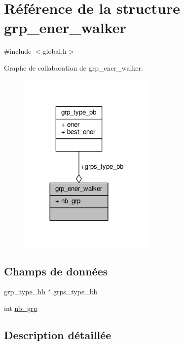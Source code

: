 \hypertarget{structgrp__ener__walker}{\section{Référence de la structure grp\+\_\+ener\+\_\+walker}
\label{structgrp__ener__walker}
}


{\ttfamily \#include $<$global.\+h$>$}



Graphe de collaboration de grp\+\_\+ener\+\_\+walker\+:\nopagebreak
\begin{figure}[H]
\begin{center}
\leavevmode
\includegraphics[width=192pt]{structgrp__ener__walker__coll__graph}
\end{center}
\end{figure}
\subsection*{Champs de données}
\begin{DoxyCompactItemize}
\item 
\hyperlink{structgrp__type__bb}{grp\+\_\+type\+\_\+bb} $\ast$ \hyperlink{structgrp__ener__walker_a780a988459d97e7822099035f7affc55}{grps\+\_\+type\+\_\+bb}
\item 
int \hyperlink{structgrp__ener__walker_a49ddc6190afbdbb42ad35606564acca4}{nb\+\_\+grp}
\end{DoxyCompactItemize}


\subsection{Description détaillée}


